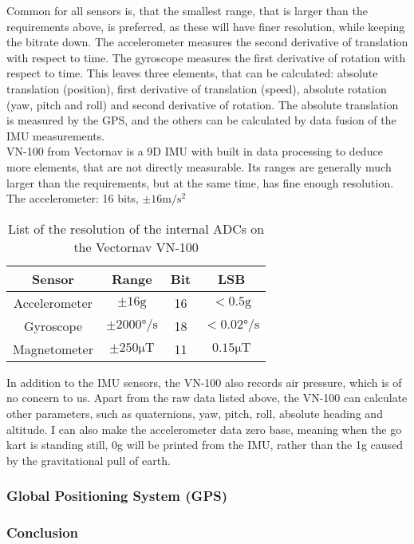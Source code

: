 Common for all sensors is, that the smallest range, that is larger than the requirements above, is preferred, as these will have finer resolution, while keeping the bitrate down.
The accelerometer measures the second derivative of translation with respect to time. 
The gyroscope measures the first derivative of rotation with respect to time.
This leaves three elements, that can be calculated: absolute translation (position), first derivative of translation (speed), absolute rotation (yaw, pitch and roll) and second derivative of rotation.
The absolute translation is measured by the GPS, and the others can be calculated by data fusion of the IMU measurements.\\

VN-100 from Vectornav is a 9D IMU with built in data processing to deduce more elements, that are not directly measurable.
Its ranges are generally much larger than the requirements, but at the same time, has fine enough resolution.
The accelerometer: 16 bits,  $\pm 16 \si{\meter \per \second \squared}$

\begin{table}
	\centering
	\begin{tabular}{ c | c c c}
		{\textbf{Sensor}} & {\textbf{Range}} & {\textbf{Bit}} & {\textbf{LSB}}\\
		\hline
		{Accelerometer}	& { $\pm 16 \mathrm{g}$}					& {16}	& {$< 0.5 \mathrm{g}$}\\
		{Gyroscope}		& { $\pm 2000\si{\degree \per \second}$ }	& {18}	& {$<0.02 \si{\degree \per \second}$}\\
		{Magnetometer}	& { $\pm 250 \si{\micro \tesla}$}			& {11}	& {$0.15 \si{\micro \tesla}$}
	\end{tabular}
	\caption{List of the resolution of the internal ADCs on the Vectornav VN-100}
	\label{tab:vectornav_measurement_resolution}
\end{table}

In addition to the IMU sensors, the VN-100 also records air pressure, which is of no concern to us.
Apart from the raw data listed above, the VN-100 can calculate other parameters, such as quaternions, yaw, pitch, roll, absolute heading and altitude.
I can also make the accelerometer data zero base, meaning when the go kart is standing still, 0g will be printed from the IMU, rather than the 1g caused by the gravitational pull of earth. 

\subsubsection*{Global Positioning System (GPS)}


\subsubsection*{Conclusion}
